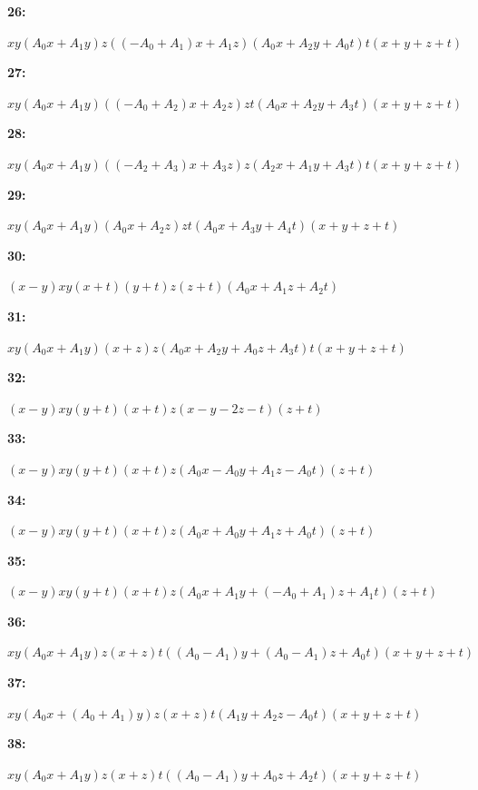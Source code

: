 \documentclass[12pt]{amsart}
\theoremstyle{plain}
\theoremstyle{remark}
\theoremstyle{definition}
\numberwithin{table}{section}
\begin{document}
\noindent\parbox[right]{9mm}{\textbf{26:}}\parbox{3mm}{\hfill}%
\parbox[t]{15cm}{\(xy(A_{0}x + A_{1}y)z((-A_{0} + A_{1})x + A_{1}z)(A_{0}x + A_{2}y + A_{0}t)t(x + y + z + t)\)}

\noindent\parbox[right]{9mm}{\textbf{27:}}\parbox{3mm}{\hfill}%
\parbox[t]{15cm}{\(xy(A_{0}x + A_{1}y)((-A_{0} + A_{2})x + A_{2}z)zt(A_{0}x + A_{2}y + A_{3}t)(x + y + z + t)\)}

\noindent\parbox[right]{9mm}{\textbf{28:}}\parbox{3mm}{\hfill}%
\parbox[t]{15cm}{\(xy(A_{0}x + A_{1}y)((-A_{2} + A_{3})x + A_{3}z)z(A_{2}x + A_{1}y + A_{3}t)t(x + y + z + t)\)}

\noindent\parbox[right]{9mm}{\textbf{29:}}\parbox{3mm}{\hfill}%
\parbox[t]{15cm}{\(xy(A_{0}x + A_{1}y)(A_{0}x + A_{2}z)zt(A_{0}x + A_{3}y + A_{4}t)(x + y + z + t)\)}

\noindent\parbox[right]{9mm}{\textbf{30:}}\parbox{3mm}{\hfill}%
\parbox[t]{15cm}{\((x - y)xy(x + t)(y + t)z(z + t)(A_{0}x + A_{1}z + A_{2}t)\)}

\noindent\parbox[right]{9mm}{\textbf{31:}}\parbox{3mm}{\hfill}%
\parbox[t]{15cm}{\(xy(A_{0}x + A_{1}y)(x + z)z(A_{0}x + A_{2}y + A_{0}z + A_{3}t)t(x + y + z + t)\)}

\noindent\parbox[right]{9mm}{\textbf{32:}}\parbox{3mm}{\hfill}%
\parbox[t]{15cm}{\((x - y)xy(y + t)(x + t)z(x - y - 2z - t)(z + t)\)}

\noindent\parbox[right]{9mm}{\textbf{33:}}\parbox{3mm}{\hfill}%
\parbox[t]{15cm}{\((x - y)xy(y + t)(x + t)z(A_{0}x - A_{0}y + A_{1}z - A_{0}t)(z + t)\)}

\noindent\parbox[right]{9mm}{\textbf{34:}}\parbox{3mm}{\hfill}%
\parbox[t]{15cm}{\((x - y)xy(y + t)(x + t)z(A_{0}x + A_{0}y + A_{1}z + A_{0}t)(z + t)\)}

\noindent\parbox[right]{9mm}{\textbf{35:}}\parbox{3mm}{\hfill}%
\parbox[t]{15cm}{\((x - y)xy(y + t)(x + t)z(A_{0}x + A_{1}y + (-A_{0} + A_{1})z + A_{1}t)(z + t)\)}

\noindent\parbox[right]{9mm}{\textbf{36:}}\parbox{3mm}{\hfill}%
\parbox[t]{15cm}{\(xy(A_{0}x + A_{1}y)z(x + z)t((A_{0} - A_{1})y + (A_{0} - A_{1})z + A_{0}t)(x + y + z + t)\)}

\noindent\parbox[right]{9mm}{\textbf{37:}}\parbox{3mm}{\hfill}%
\parbox[t]{15cm}{\(xy(A_{0}x + (A_{0} + A_{1})y)z(x + z)t(A_{1}y + A_{2}z - A_{0}t)(x + y + z + t)\)}

\noindent\parbox[right]{9mm}{\textbf{38:}}\parbox{3mm}{\hfill}%
\parbox[t]{15cm}{\(xy(A_{0}x + A_{1}y)z(x + z)t((A_{0} - A_{1})y + A_{0}z + A_{2}t)(x + y + z + t)\)}
\end{document}
